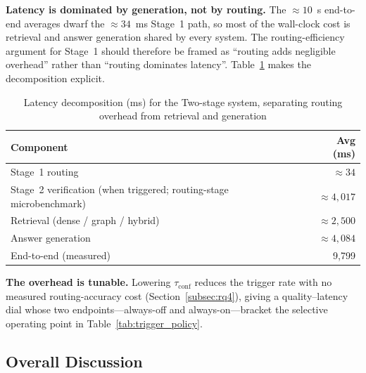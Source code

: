 \noindent\textbf{Latency is dominated by generation, not by routing.} The
$\approx\!10$~s end-to-end averages dwarf the $\approx\!34$~ms Stage~1 path,
so most of the wall-clock cost is retrieval and answer generation shared by
every system. The routing-efficiency argument for Stage~1 should therefore be
framed as ``routing adds negligible overhead'' rather than ``routing dominates
latency''. Table~\ref{tab:latency_decomp} makes the decomposition explicit.

\begin{table}[!htbp]
\centering
\caption{Latency decomposition (ms) for the Two-stage system, separating
routing overhead from retrieval and generation}\label{tab:latency_decomp}
\begin{tabular}{lr}
\toprule
\textbf{Component} & \textbf{Avg (ms)} \\
\midrule
Stage~1 routing            & $\approx 34$ \\
Stage~2 verification (when triggered; routing-stage microbenchmark) & $\approx 4{,}017$ \\
Retrieval (dense / graph / hybrid) & $\approx 2{,}500$ \\
Answer generation          & $\approx 4{,}084$ \\
\midrule
End-to-end (measured)      & 9{,}799 \\
\bottomrule
\end{tabular}
\end{table}

\noindent\textbf{The overhead is tunable.} Lowering $\tau_{\mathrm{conf}}$
reduces the trigger rate with no measured routing-accuracy cost
(Section~\ref{subsec:rq4}), giving a quality--latency dial whose two
endpoints---always-off and always-on---bracket the selective operating point
in Table~\ref{tab:trigger_policy}.

\subsection{Overall Discussion}\label{subsec:discussion}


